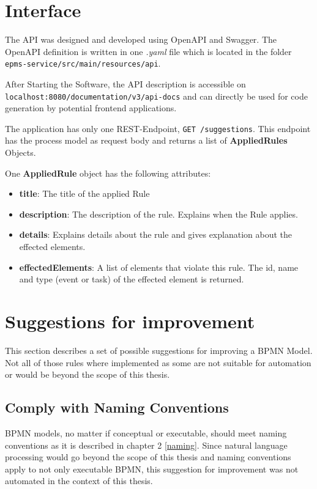 \section{Interface}
The API was designed and developed using OpenAPI and Swagger\cite{swagger}. The OpenAPI definition is written in one \textit{.yaml} file which is located in the folder\\ \verb|epms-service/src/main/resources/api|.

After Starting the Software, the API description is accessible on \\ \verb|localhost:8080/documentation/v3/api-docs| and can directly be used for code generation by potential frontend applications. 

The application has only one REST-Endpoint, \verb|GET /suggestions|. This endpoint has the process model as request body and returns a list of \textbf{AppliedRules} Objects. 

One \textbf{AppliedRule} object has the following attributes:
\begin{itemize}
	\item \textbf{title}: The title of the applied Rule
	\item \textbf{description}: The description of the rule. Explains when the Rule applies.
	\item \textbf{details}: Explains details about the rule and gives explanation about the effected elements.
	\item \textbf{effectedElements}: A list of elements that violate this rule. The id, name and type (event or task) of the effected element is returned.
\end{itemize} 
\section{Suggestions for improvement}
This section describes a set of possible suggestions for improving a BPMN Model. Not all of those rules where implemented as some are not suitable for automation or would be beyond the scope of this thesis. 
\subsection{Comply with Naming Conventions}
BPMN models, no matter if conceptual or executable, should meet naming conventions as it is described in chapter 2 \ref{naming}. 
Since natural language processing would go beyond the scope of this thesis and naming conventions apply to not only executable BPMN, this suggestion for improvement was not automated in the context of this thesis.

